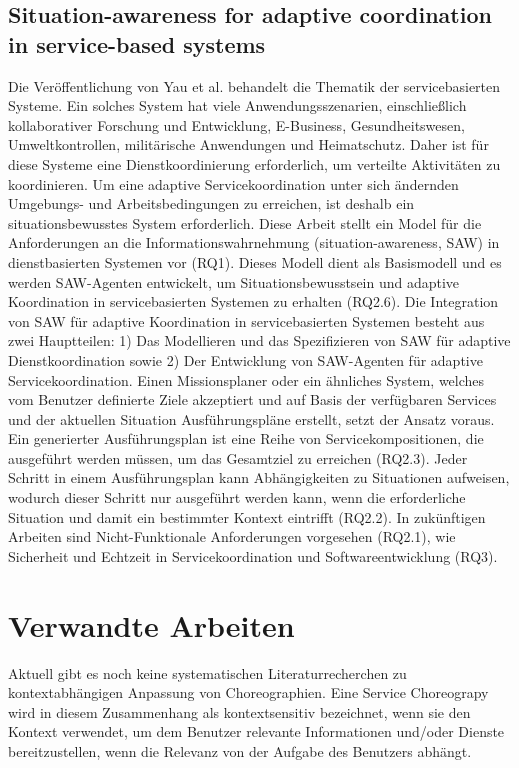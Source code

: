 \documentclass[conference,compsoc,ngerman]{IEEEtran}
\begin{document}
\subsection{Situation-awareness for adaptive coordination in service-based systems}

Die Veröffentlichung von Yau et al. \cite{huang2005situationaware} behandelt die Thematik der servicebasierten Systeme. Ein solches System hat viele Anwendungsszenarien, einschließlich kollaborativer Forschung und Entwicklung, E-Business, Gesundheitswesen, Umweltkontrollen, militärische Anwendungen und Heimatschutz. Daher ist für diese Systeme eine Dienstkoordinierung erforderlich, um verteilte Aktivitäten zu koordinieren. Um eine adaptive Servicekoordination unter sich ändernden Umgebungs- und Arbeitsbedingungen zu erreichen, ist deshalb ein situationsbewusstes System erforderlich. Diese Arbeit stellt ein Model für die Anforderungen an die Informationswahrnehmung (situation-awareness, SAW) in dienstbasierten Systemen vor (RQ1). Dieses Modell dient als Basismodell und es werden SAW-Agenten entwickelt, um Situationsbewusstsein  und adaptive Koordination in servicebasierten Systemen zu erhalten (RQ2.6). Die Integration von SAW für adaptive Koordination in servicebasierten Systemen besteht aus zwei Hauptteilen: 1) Das Modellieren und das Spezifizieren von SAW für adaptive Dienstkoordination sowie 2) Der Entwicklung von SAW-Agenten für adaptive Servicekoordination. Einen Missionsplaner oder ein ähnliches System, welches vom Benutzer definierte Ziele akzeptiert und auf Basis der verfügbaren Services und der aktuellen Situation Ausführungspläne erstellt, setzt der Ansatz voraus. Ein generierter Ausführungsplan ist eine Reihe von Servicekompositionen, die ausgeführt werden müssen, um das Gesamtziel zu erreichen (RQ2.3). Jeder Schritt in einem Ausführungsplan kann Abhängigkeiten zu Situationen aufweisen, wodurch dieser Schritt nur ausgeführt werden kann, wenn die erforderliche Situation und damit ein bestimmter Kontext eintrifft (RQ2.2). In zukünftigen Arbeiten sind Nicht-Funktionale Anforderungen vorgesehen (RQ2.1), wie Sicherheit und Echtzeit in Servicekoordination und Softwareentwicklung (RQ3).  


\section{Verwandte Arbeiten}\label{s:verwandteArbeiten}
Aktuell gibt es noch keine systematischen Literaturrecherchen zu kontextabhängigen Anpassung von Choreographien.
Eine Service Choreograpy wird in diesem Zusammenhang als kontextsensitiv bezeichnet, wenn sie \glqq den Kontext verwendet, um dem Benutzer relevante Informationen und/oder Dienste bereitzustellen, wenn die Relevanz von der Aufgabe des Benutzers abhängt.\grqq~\cite[S.~2]{dey2001understanding}
\end{document}
